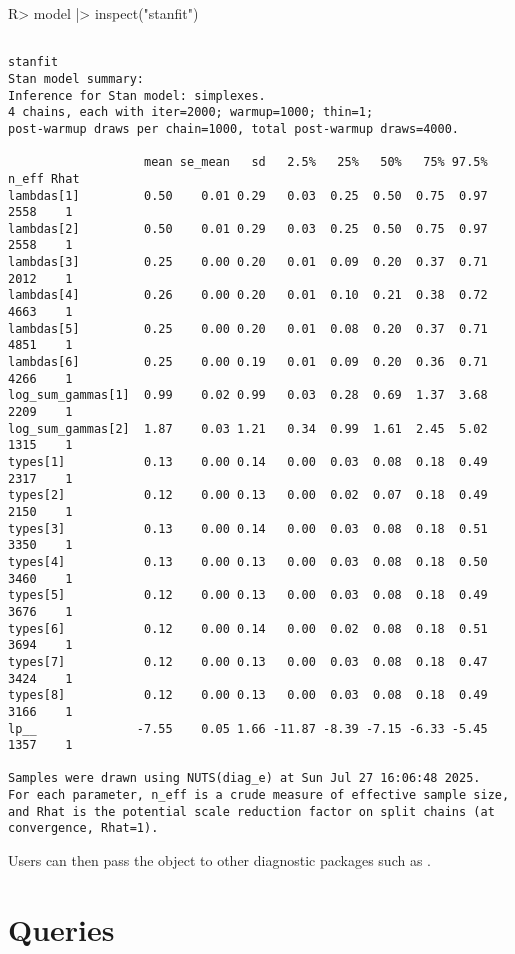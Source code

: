 \documentclass[
  11pt,
  article]{jss}
\renewcommand{\texttt}[1]{\code{#1}}
\begin{document}
\begin{CodeInput}
R> model |> inspect("stanfit")
\end{CodeInput}

\begin{verbatim}

stanfit
Stan model summary:
Inference for Stan model: simplexes.
4 chains, each with iter=2000; warmup=1000; thin=1; 
post-warmup draws per chain=1000, total post-warmup draws=4000.

                   mean se_mean   sd   2.5%   25%   50%   75% 97.5% n_eff Rhat
lambdas[1]         0.50    0.01 0.29   0.03  0.25  0.50  0.75  0.97  2558    1
lambdas[2]         0.50    0.01 0.29   0.03  0.25  0.50  0.75  0.97  2558    1
lambdas[3]         0.25    0.00 0.20   0.01  0.09  0.20  0.37  0.71  2012    1
lambdas[4]         0.26    0.00 0.20   0.01  0.10  0.21  0.38  0.72  4663    1
lambdas[5]         0.25    0.00 0.20   0.01  0.08  0.20  0.37  0.71  4851    1
lambdas[6]         0.25    0.00 0.19   0.01  0.09  0.20  0.36  0.71  4266    1
log_sum_gammas[1]  0.99    0.02 0.99   0.03  0.28  0.69  1.37  3.68  2209    1
log_sum_gammas[2]  1.87    0.03 1.21   0.34  0.99  1.61  2.45  5.02  1315    1
types[1]           0.13    0.00 0.14   0.00  0.03  0.08  0.18  0.49  2317    1
types[2]           0.12    0.00 0.13   0.00  0.02  0.07  0.18  0.49  2150    1
types[3]           0.13    0.00 0.14   0.00  0.03  0.08  0.18  0.51  3350    1
types[4]           0.13    0.00 0.13   0.00  0.03  0.08  0.18  0.50  3460    1
types[5]           0.12    0.00 0.13   0.00  0.03  0.08  0.18  0.49  3676    1
types[6]           0.12    0.00 0.14   0.00  0.02  0.08  0.18  0.51  3694    1
types[7]           0.12    0.00 0.13   0.00  0.03  0.08  0.18  0.47  3424    1
types[8]           0.12    0.00 0.13   0.00  0.03  0.08  0.18  0.49  3166    1
lp__              -7.55    0.05 1.66 -11.87 -8.39 -7.15 -6.33 -5.45  1357    1

Samples were drawn using NUTS(diag_e) at Sun Jul 27 16:06:48 2025.
For each parameter, n_eff is a crude measure of effective sample size,
and Rhat is the potential scale reduction factor on split chains (at 
convergence, Rhat=1).
\end{verbatim}

Users can then pass the \texttt{stanfit} object to other diagnostic
packages such as \texttt{bayesplot}.

\section{Queries}\label{sec-query}
\end{document}
